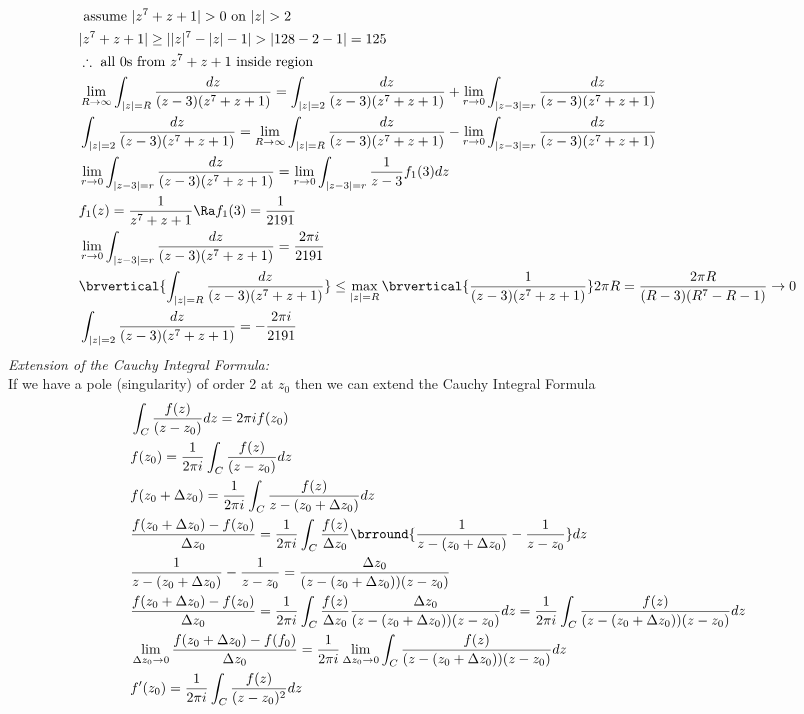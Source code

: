 \begin{align*}
    &\text{ assume }|z^7+z+1|>0\text{ on }|z|>2\\
    &|z^7+z+1|\geq||z|^7-|z|-1|>|128-2-1|=125\\
    &\therefore\ \text{all 0s from $z^7+z+1$ inside region}\\
    &\lim_{R\to\infty}\int_{|z|=R}\frac{dz}{(z-3)(z^7+z+1)}=\int_{|z|=2}\frac{dz}{(z-3)(z^7+z+1)}+\lim_{r\to0}\int_{|z-3|=r}\frac{dz}{(z-3)(z^7+z+1)}\\
    &\int_{|z|=2}\frac{dz}{(z-3)(z^7+z+1)}=\lim_{R\to\infty}\int_{|z|=R}\frac{dz}{(z-3)(z^7+z+1)}-\lim_{r\to0}\int_{|z-3|=r}\frac{dz}{(z-3)(z^7+z+1)}\\
    &\lim_{r\to0}\int_{|z-3|=r}\frac{dz}{(z-3)(z^7+z+1)}=\lim_{r\to0}\int_{|z-3|=r}\frac{1}{z-3}f_1(3)dz\\
    &f_1(z)=\frac{1}{z^7+z+1}\Ra f_1(3)=\frac{1}{2191}\\
    &\lim_{r\to0}\int_{|z-3|=r}\frac{dz}{(z-3)(z^7+z+1)}=\frac{2\pi i}{2191}\\
    &\brvertical{\int_{|z|=R}\frac{dz}{(z-3)(z^7+z+1)}}\leq\max_{|z|=R}\brvertical{\frac{1}{(z-3)(z^7+z+1)}}2\pi R=\frac{2\pi R}{(R-3)(R^7-R-1)}\to0\\
    &\int_{|z|=2}\frac{dz}{(z-3)(z^7+z+1)}=-\frac{2\pi i}{2191}
\end{align*}
\textit{Extension of the Cauchy Integral Formula:}\\
If we have a pole (singularity) of order 2 at $z_0$ then we can extend the Cauchy Integral Formula
\begin{align*}
    &\int_C\frac{f(z)}{(z-z_0)}dz=2\pi if(z_0)\\
    &f(z_0)=\frac{1}{2\pi i}\int_C\frac{f(z)}{(z-z_0)}dz\\
    &f(z_0+\Delta z_0)=\frac{1}{2\pi i}\int_C\frac{f(z)}{z-(z_0+\Delta z_0)}dz\\
    &\frac{f(z_0+\Delta z_0)-f(z_0)}{\Delta z_0}=\frac{1}{2\pi i}\int_C\frac{f(z)}{\Delta z_0}\brround{\frac{1}{z-(z_0+\Delta z_0)}-\frac{1}{z-z_0}}dz\\
    &\frac{1}{z-(z_0+\Delta z_0)}-\frac{1}{z-z_0}=\frac{\Delta z_0}{(z-(z_0+\Delta z_0))(z-z_0)}\\
    &\frac{f(z_0+\Delta z_0)-f(z_0)}{\Delta z_0}=\frac{1}{2\pi i}\int_C\frac{f(z)}{\Delta z_0}\frac{\Delta z_0}{(z-(z_0+\Delta z_0))(z-z_0)}dz=\frac{1}{2\pi i}\int_C\frac{f(z)}{(z-(z_0+\Delta z_0))(z-z_0)}dz\\
    &\lim_{\Delta z_0\to0}\frac{f(z_0+\Delta z_0)-f(f_0)}{\Delta z_0}=\frac{1}{2\pi i}\lim_{\Delta z_0\to 0}\int_C\frac{f(z)}{(z-(z_0+\Delta z_0))(z-z_0)}dz\\
    &f'(z_0)=\frac{1}{2\pi i}\int_C\frac{f(z)}{(z-z_0)^2}dz
\end{align*}
